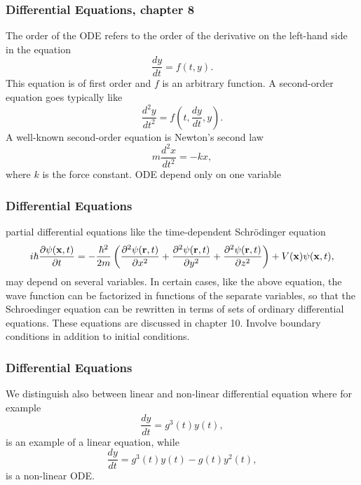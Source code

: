 \documentclass{beamer}
\begin{document}
\begin{frame}
\frametitle{Differential Equations, chapter 8}

\begin{block}{}
The order of the ODE refers to the order of the derivative 
on the left-hand side in the equation
\begin{equation} 
   \frac{dy}{dt}=f(t,y).
\end{equation}
This equation is of first order and $f$ is an arbitrary function.
A second-order equation goes typically like
\begin{equation} 
   \frac{d^2y}{dt^2}=f(t,\frac{dy}{dt},y).
\end{equation}
A well-known second-order equation is Newton's second law
\begin{equation} 
   m\frac{d^2x}{dt^2}=-kx,
   \label{eq:newton}
\end{equation}
where $k$ is the force constant. ODE depend only on one
variable
\end{block}
\end{frame}

\begin{frame}
\frametitle{Differential Equations}

\begin{block}{}
partial differential equations like the time-dependent Schr\"odinger
equation 
\begin{equation}
   i\hbar\frac{\partial \psi({\bf x},t)}{\partial t}=
   -\frac{\hbar^2}{2m}\left( \frac{\partial^2 \psi({\bf r},t)}{\partial x^2} +
                            \frac{\partial^2 \psi({\bf r},t)}{\partial y^2}+
                            \frac{\partial^2 \psi({\bf r},t)}{\partial z^2}\right) + V({\bf x})\psi({\bf x},t),
\end{equation}
may depend on several variables. In certain cases, like the above
equation, the wave function can be factorized in functions of the separate
variables, so that the Schroedinger equation 
can be rewritten in terms of sets of ordinary differential equations.
These equations are discussed in chapter 10. Involve boundary conditions in addition to initial conditions.
\end{block}
\end{frame}

\begin{frame}
\frametitle{Differential Equations}

\begin{block}{}
We distinguish also between linear and non-linear differential
equation where for example
\begin{equation} 
   \frac{dy}{dt}=g^3(t)y(t),
\end{equation}
is an example of a linear equation, while 
\begin{equation} 
   \frac{dy}{dt}=g^3(t)y(t)-g(t)y^2(t),
\end{equation}
is a non-linear ODE.
\end{block}
\end{frame}
\end{document}
